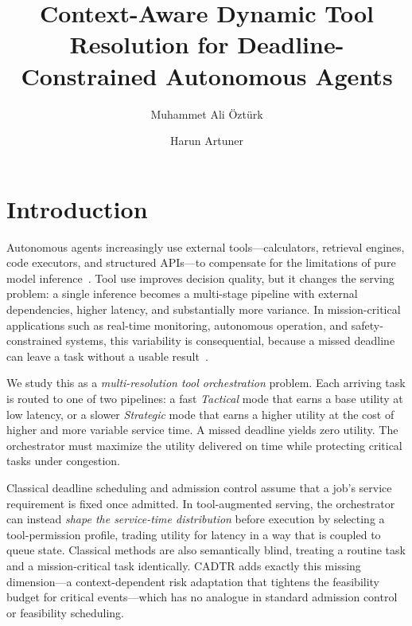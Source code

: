 \documentclass[fleqn,12pt,lineno]{wlpeerj}
\title{Context-Aware Dynamic Tool Resolution for Deadline-Constrained Autonomous Agents}
\author[1]{Muhammet Ali Öztürk}
\author[1]{Harun Artuner}
\affil[1]{Hacettepe University, Ankara, Turkiye}
\begin{document}
\raggedright
\maketitle
\thispagestyle{empty}

\section{Introduction}
Autonomous agents increasingly use external tools---calculators, retrieval engines, code executors, and structured APIs---to compensate for the limitations of pure model inference~\cite{yao2023react,schick2023toolformer}. Tool use improves decision quality, but it changes the serving problem: a single inference becomes a multi-stage pipeline with external dependencies, higher latency, and substantially more variance. In mission-critical applications such as real-time monitoring, autonomous operation, and safety-constrained systems, this variability is consequential, because a missed deadline can leave a task without a usable result~\cite{10.1007/978-3-319-16086-3_16}.

We study this as a \emph{multi-resolution tool orchestration} problem. Each arriving task is routed to one of two pipelines: a fast \emph{Tactical} mode that earns a base utility at low latency, or a slower \emph{Strategic} mode that earns a higher utility at the cost of higher and more variable service time. A missed deadline yields zero utility. The orchestrator must maximize the utility delivered on time while protecting critical tasks under congestion.

Classical deadline scheduling and admission control assume that a job's service requirement is fixed once admitted. In tool-augmented serving, the orchestrator can instead \emph{shape the service-time distribution} before execution by selecting a tool-permission profile, trading utility for latency in a way that is coupled to queue state. Classical methods are also semantically blind, treating a routine task and a mission-critical task identically. CADTR adds exactly this missing dimension---a context-dependent risk adaptation that tightens the feasibility budget for critical events---which has no analogue in standard admission control or feasibility scheduling.
\end{document}
